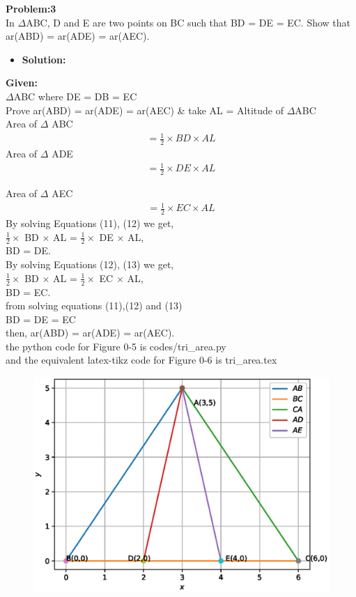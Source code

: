 \begin{frame}
{\textbf{Problem:3}\\In $\Delta$ABC, D and E are two points on BC such that BD = DE = EC. Show that ar(ABD) = ar(ADE) = ar(AEC).}
\begin{itemize}
\item \textbf{Solution:}
\end{itemize}
\textbf{Given:}\\
$\Delta$ABC where DE = DB = EC\\
Prove ar(ABD) = ar(ADE) = ar(AEC) \& take AL = Altitude of $\Delta$ABC\\
 Area of $\Delta$ ABC \begin{align}= \frac{1}{2}\times BD \times AL  \end{align}
 Area of $\Delta$ ADE \begin{align} = \frac{1}{2}\times DE \times AL \end{align}
\end{frame}
\begin{frame}
Area of $\Delta$ AEC \begin{align}= \frac{1}{2}\times EC \times AL \end{align}
By solving Equations (11), (12) we get,\\
$\frac{1}{2}\times$ BD $\times$ AL = $\frac{1}{2}\times$ DE $\times$ AL,\\ 
BD = DE. \\\enspace
By solving Equations (12), (13) we get,\\
$\frac{1}{2}\times$ BD $\times$ AL = $\frac{1}{2}\times$ EC $\times$ AL,\\
BD = EC. \\
from solving equations (11),(12) and (13) \\
BD = DE = EC\\\enspace
then, ar(ABD) = ar(ADE) = ar(AEC).\\\enspace
the python code for  Figure 0-5 is codes/tri\_area.py\\
and the equivalent latex-tikz code for Figure 0-6 is tri\_area.tex
\end{frame}
\begin{frame}{}
\begin{figure}[!ht]
	\begin{center}
\includegraphics[width=0.8\columnwidth]{./figs/tri_area.eps}
	\end{center}
	\caption{}
	\label{}	
\end{figure}
\end{frame}
